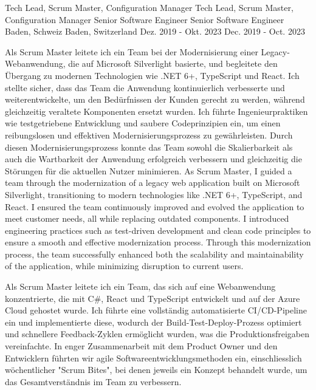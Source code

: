 \begin{cventries}
	\cventry
	{ 	}
	{  	}
	{  	}
	{  	}
	{  	}
	
	\cventry
	{
			{ Tech Lead, Scrum Master, Configuration Manager }
			{ Tech Lead, Scrum Master, Configuration Manager }
	} %
	{
			{ Senior Software Engineer }
			{ Senior Software Engineer }
	} %
	{
			{ Baden, Schweiz }
			{ Baden, Switzerland }
	} %
	{
			{ Dez. 2019 - Okt. 2023 }
			{ Dec. 2019 - Oct. 2023 }
	} %
	{
		\begin{cvitems}
			\item {
				{
					Als Scrum Master leitete ich ein Team bei der Modernisierung einer Legacy-Webanwendung, die auf Microsoft Silverlight basierte, und begleitete den Übergang zu modernen Technologien wie .NET 6+, TypeScript und React. Ich stellte sicher, dass das Team die Anwendung kontinuierlich verbesserte und weiterentwickelte, um den Bedürfnissen der Kunden gerecht zu werden, während gleichzeitig veraltete Komponenten ersetzt wurden. Ich führte Ingenieurpraktiken wie testgetriebene Entwicklung und saubere Codeprinzipien ein, um einen reibungslosen und effektiven Modernisierungsprozess zu gewährleisten. Durch diesen Modernisierungsprozess konnte das Team sowohl die Skalierbarkeit als auch die Wartbarkeit der Anwendung erfolgreich verbessern und gleichzeitig die Störungen für die aktuellen Nutzer minimieren.
				}
				{
					As Scrum Master, I guided a team through the modernization of a legacy web application built on Microsoft Silverlight, transitioning to modern technologies like .NET 6+, TypeScript, and React. I ensured the team continuously improved and evolved the application to meet customer needs, all while replacing outdated components. I introduced engineering practices such as test-driven development and clean code principles to ensure a smooth and effective modernization process. Through this modernization process, the team successfully enhanced both the scalability and maintainability of the application, while minimizing disruption to current users.
				}
			}
			\item {
				{
					Als Scrum Master leitete ich ein Team, das sich auf eine Webanwendung konzentrierte, die mit C\#, React und TypeScript entwickelt und auf der Azure Cloud gehostet wurde. Ich führte eine vollständig automatisierte CI/CD-Pipeline ein und implementierte diese, wodurch der Build-Test-Deploy-Prozess optimiert und schnellere Feedback-Zyklen ermöglicht wurden, was die Produktionsfreigaben vereinfachte. In enger Zusammenarbeit mit dem Product Owner und den Entwicklern führten wir agile Softwareentwicklungsmethoden ein, einschliesslich wöchentlicher "Scrum Bites", bei denen jeweils ein Konzept behandelt wurde, um das Gesamtverständnis im Team zu verbessern.
}}
\end{cvitems}}
\end{cventries}
